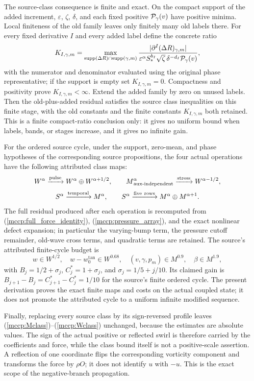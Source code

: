 \documentclass[11pt]{article}
\begin{document}
The source-class consequence is finite and exact. On the compact support
of the added increment, $\varepsilon$, $\zeta$, $\delta$, and each fixed
positive ${\cal P}_\gamma(v)$ have positive minima. Local finiteness of
the old family leaves only finitely many old labels there. For every
fixed derivative $I$ and every added label define the concrete ratio
\[
 K_{I,\gamma,m}=
 \max_{\operatorname{supp}(\Delta R)\cap\operatorname{supp}(\gamma,m)}
 \frac{|\partial^I(\Delta R)_{\gamma,m}|}
 {\varepsilon^\alpha S_*^{b_I}\sqrt\zeta\,\delta^{-d_I}{\cal P}_\gamma(v)},
\]
with the numerator and denominator evaluated using the original phase
representative; if the support is empty set $K_{I,\gamma,m}=0$.
Compactness and positivity prove $K_{I,\gamma,m}<\infty$. Extend the
added family by zero on unused labels. Then the old-plus-added residual
satisfies the source class inequalities on this finite stage, with the
old constants and the finite constants $K_{I,\gamma,m}$ both retained.
This is a finite compact-ratio conclusion only: it gives no uniform bound
when labels, bands, or stages increase, and it gives no infinite gain.

For the ordered source cycle, under the support, zero-mean, and phase
hypotheses of the corresponding source propositions, the four actual
operations have the following attributed class maps:
\[
 W^\alpha\xrightarrow{\rm pulse}W^\alpha\oplus W^{\alpha+1/2},\qquad
 M^\alpha_{\,\mathrm{aux\text{-}independent}}
       \xrightarrow{\rm stress}W^{\alpha-1/2},
\]
\[
 S^\alpha\xrightarrow{\rm temporal}M^\alpha,
 \qquad S^\alpha\xrightarrow{\rm five\ rows}M^\alpha\oplus M^{\alpha+1}.
\]
The full residual produced after each operation is recomputed from
(\ref{mccp:full_force_identity}), (\ref{mccp:pressure_array}), and the
exact nonlinear defect expansion; in particular the varying-bump term,
the pressure cutoff remainder, old-wave cross terms, and quadratic terms
are retained. The source's attributed finite-cycle budget is
\[
 w\in W^{1/2},\quad w-w_0^{\tan}\in W^{0.68},\quad
 (v,\gamma,p_m)\in M^{0.9},\quad \beta\in M^{1.9},
\]
with $B_j=1/2+\sigma_j$, $C_j^*=1+\sigma_j$, and
$\sigma_j=1/5+j/10$. Its claimed gain is
$B_{j+1}-B_j=C_{j+1}^*-C_j^*=1/10$ for the source's finite ordered
cycle. The present derivation proves the exact finite maps and costs on
the actual coupled state; it does not promote the attributed cycle to a
uniform infinite modified sequence.

Finally, replacing every source class by its sign-reversed profile leaves
(\ref{mccp:Mclass})--(\ref{mccp:Wclass}) unchanged, because the estimates
are absolute values. The sign of the actual positive or reflected swirl is
therefore carried by the coefficients and force, while the class bound
itself is not a positive-scale assertion. A reflection of one coordinate
flips the corresponding vorticity component and transforms the force by
$\rho O$; it does not identify $u$ with $-u$. This is the exact scope of
the negative-branch propagation.
\label{mccp:conclusion}
\end{document}
